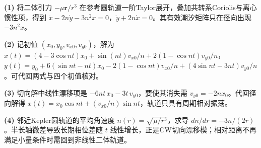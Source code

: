 \par\noindent\textbf{(1)} 将二体引力 \(-\mu\boldsymbol r/r^3\) 在参考圆轨道一阶Taylor展开，叠加共转系Coriolis与离心惯性项，得到 \(\ddot x-2n\dot y-3n^2x=0\)，\(\ddot y+2n\dot x=0\)。其有效潮汐矩阵只在径向出现 \(-3n^2x\)。
\par\noindent\textbf{(2)} 记初值 \((x_0,y_0,v_{x0},v_{y0})\)，解为 \(x(t)=(4-3\cos nt)x_0+\sin(nt)v_{x0}/n+2(1-\cos nt)v_{y0}/n\)，\(y(t)=y_0+6(\sin nt-nt)x_0-2(1-\cos nt)v_{x0}/n+(4\sin nt-3nt)v_{y0}/n\)。可代回两式与四个初值核对。
\par\noindent\textbf{(3)} 切向解中线性漂移项是 \(-6nt\,x_0-3t\,v_{y0}\)，要使其消失需 \(v_{y0}=-2nx_0\)。代回径向解得 \(x(t)=x_0\cos nt+(v_{x0}/n)\sin nt\)，轨道只具有周期相对振荡。
\par\noindent\textbf{(4)} 邻近Kepler圆轨道的平均角速度 \(n(r)=\sqrt{\mu/r^3}\)，求导 \(dn/dr=-3n/(2r)\)。半长轴微差导致长期相位差随 \(t\) 线性增长，正是CW切向漂移模；相对距离不再满足小量条件时需回到非线性二体轨道。
